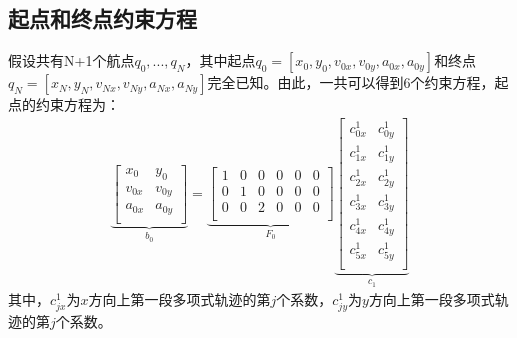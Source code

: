 \documentclass[master,academic]{ysuthesis} %
\begin{document}
		\subsection{起点和终点约束方程} 
		假设共有N+1个航点$q_0,...,q_N$，其中起点$q_0=[x_0,y_0,v_{0x},v_{0y},a_{0x},a_{0y}]$和终点$q_N=[x_N,y_N,v_{Nx},v_{Ny},a_{Nx},a_{Ny}]$完全已知。由此，一共可以得到6个约束方程，起点的约束方程为：
		\begin{equation}
			\begin{aligned}
			\underbrace{\begin{bmatrix}
				x_0&		y_0\\
				v_{0x}&		v_{0y}\\
				a_{0x}&		a_{0y}\\
			\end{bmatrix}}_{b_0} 
			 = \underbrace{\begin{bmatrix}
				1&		0&		0&		0&		0&		0\\
				0&		1&		0&		0&		0&		0\\
				0&		0&		2&		0&		0&		0\\
			\end{bmatrix}}_{F_0}
			\underbrace{\begin{bmatrix}
				c_{0x}^{1}&		c_{0y}^{1}\\
				c_{1x}^{1}&		c_{1y}^{1}\\
				c_{2x}^{1}&		c_{2y}^{1}\\
				c_{3x}^{1}&		c_{3y}^{1}\\
				c_{4x}^{1}&		c_{4y}^{1}\\
				c_{5x}^{1}&		c_{5y}^{1}\\
			\end{bmatrix}}_{c_1}
			\end{aligned}
		\end{equation}
		其中，$c^1_{jx}$为$x$方向上第一段多项式轨迹的第$j$个系数，$c^1_{jy}$为$y$方向上第一段多项式轨迹的第$j$个系数。
\end{document}
